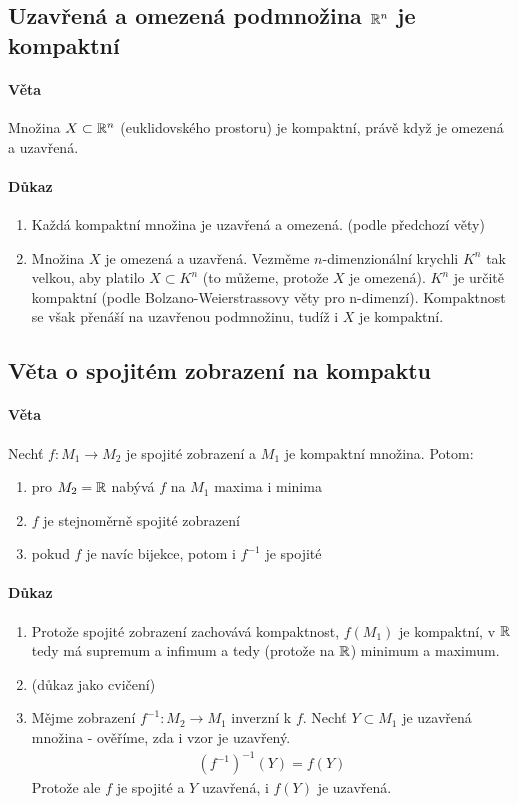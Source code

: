 \documentclass[a4paper,10pt]{article}
\begin{document}
\subsection{Uzavřená a omezená podmnožina $\mathbb{R}^n$ je kompaktní}
\setcounter{equation}{0}
\paragraph{Věta}
Množina $X\subset \mathbb{R}^n$ (euklidovského prostoru) je kompaktní, právě když je omezená a uzavřená.
\paragraph{Důkaz}
\begin{enumerate}
	\item Každá kompaktní množina je uzavřená a omezená. (podle předchozí věty)
	\item Množina $X$ je omezená a uzavřená. Vezměme $n$-dimenzionální krychli
	$K^n$ tak velkou, aby platilo $X \subset K^n$ (to můžeme, protože $X$ je
	omezená). $K^n$ je určitě kompaktní (podle Bolzano-Weierstrassovy věty pro
	n-dimenzí). Kompaktnost se však přenáší na uzavřenou podmnožinu, tudíž i $X$
	je kompaktní.
\end{enumerate}



\subsection{Věta o spojitém zobrazení na kompaktu}
\setcounter{equation}{0}
\paragraph{Věta}
Nechť $f: M_1 \to M_2$ je spojité zobrazení a $M_1$ je kompaktní množina. Potom:
\begin{enumerate}
	\item pro $M_2 = \mathbb{R}$ nabývá $f$ na $M_1$ maxima i minima
	\item $f$ je stejnoměrně spojité zobrazení
	\item pokud $f$ je navíc bijekce, potom i $f^{-1}$ je spojité
\end{enumerate}
\paragraph{Důkaz}
\begin{enumerate}
	\item Protože spojité zobrazení zachovává kompaktnost, $f(M_1)$ je
	kompaktní, v $\mathbb{R}$ tedy má supremum a infimum a tedy (protože na $\mathbb{R}$) minimum a maximum.
	\item (důkaz jako cvičení)
	\item Mějme zobrazení $f^{-1}: M_2 \to M_1$ inverzní k $f$. Nechť $Y \subset
	M_1$ je uzavřená množina - ověříme, zda i vzor je uzavřený.
	\begin{align}
		(f^{-1})^{-1} (Y) = f(Y)
	\end{align}
	Protože ale $f$ je spojité a $Y$ uzavřená, i $f(Y)$ je uzavřená.
\end{enumerate}
\end{document}
